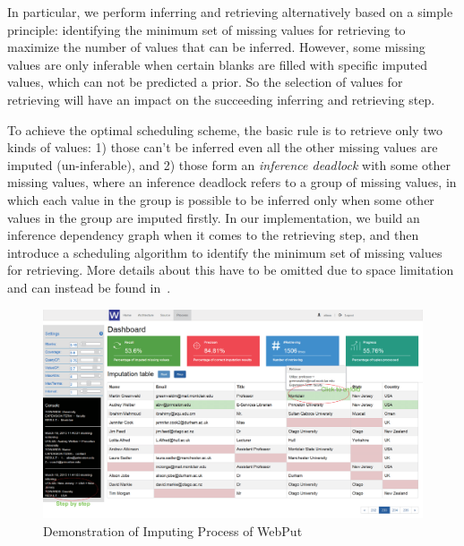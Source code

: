 \documentclass[sigconf]{acmart}
\begin{document}
In particular, we perform inferring and retrieving alternatively based on a simple principle: identifying the minimum set of missing values for retrieving to maximize the number of values that can be inferred.
%
However, some missing values are only inferable when certain blanks are filled with specific imputed values, which can not be predicted a prior. So the selection of values for retrieving will have an impact on the succeeding inferring and retrieving step.

To achieve the optimal scheduling scheme, the basic rule is to retrieve only two kinds of values: 1) those can't be inferred even all the other missing values are imputed (un-inferable), and 2) those form an {\em inference deadlock} with some other missing values, where an inference deadlock refers to a group of missing values, in which each value in the group is possible to be inferred only when some other values in the group are imputed firstly.
%
In our implementation, we build an inference dependency graph when it comes to the retrieving step, and then introduce a scheduling algorithm to identify the minimum set of missing values for retrieving. More details about this have to be omitted due to space limitation and can instead be found in~\cite{li2015trip}.

\begin{figure}
  \centerline{\includegraphics[width=18cm]{images/process_.eps}}
  \caption{Demonstration of Imputing Process of WebPut}
  \label{fig:process}
\end{figure}
\end{document}
